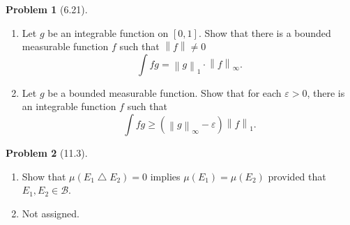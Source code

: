 \documentclass[12pt]{article}
\newcommand{\B}{\mathcal{B}}
\renewcommand{\epsilon}{\varepsilon}
\newcommand{\norm}[1]{\left\lVert #1 \right\rVert}
\theoremstyle{definition}
\newtheorem{problem}{Problem}
\begin{document}
\begin{problem}[6.21]

    \begin{enumerate}[label = (\alph{*})]
        \item Let \( g \) be an integrable function on \( [0,1] \). Show that there is a bounded measurable function \( f \) such that \( \norm{f} \neq 0 \) 
            \[
                \int fg = \norm{g}_{1} \cdot \norm{f}_{\infty}.  
            \]
        \item Let \( g \) be a bounded measurable function. Show that for each \( \epsilon > 0 \), there is an integrable function \( f \) such that 
            \[
                \int fg \geq \left( \norm{g}_{\infty} - \epsilon \right) \norm{f}_{1}. 
            \]
    \end{enumerate}


\end{problem}

\begin{problem}[11.3]

    \begin{enumerate}[label = (\alph{*})]
        \item Show that \( \mu(E_1 \bigtriangleup E_2) = 0 \) implies \( \mu(E_1) = \mu(E_2) \) provided that \( E_1, E_2 \in \B  \). 
        \item Not assigned.
    \end{enumerate}


\end{problem}
\end{document}
